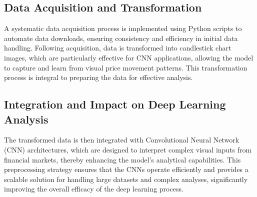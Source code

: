 \thesisspacing %

\subsection{Data Acquisition and Transformation}
A systematic data acquisition process is implemented using Python scripts to automate data downloads, ensuring consistency and efficiency in initial data handling. Following acquisition, data is transformed into candlestick chart images, which are particularly effective for CNN applications, allowing the model to capture and learn from visual price movement patterns. This transformation process is integral to preparing the data for effective analysis.

\subsection{Integration and Impact on Deep Learning Analysis}
The transformed data is then integrated with Convolutional Neural Network (CNN) architectures, which are designed to interpret complex visual inputs from financial markets, thereby enhancing the model’s analytical capabilities. This preprocessing strategy ensures that the CNNs operate efficiently and provides a scalable solution for handling large datasets and complex analyses, significantly improving the overall efficacy of the deep learning process.
